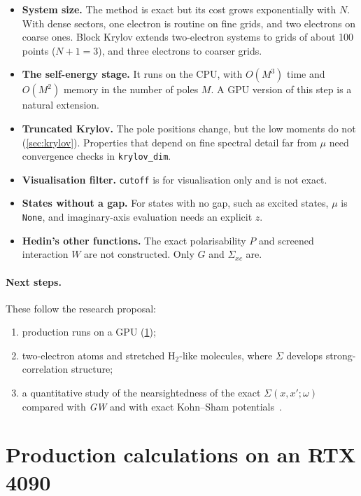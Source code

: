 \documentclass[11pt,a4paper]{article}
\newcommand{\GW}{\textit{GW}}
\newcommand{\code}[1]{\texttt{#1}}
\begin{document}
\begin{itemize}
\item \textbf{System size.} The method is exact but its cost grows exponentially with $N$. With dense sectors, one electron is routine on fine grids, and two electrons on coarse ones. Block Krylov extends two-electron systems to grids of about 100 points ($N+1=3$), and three electrons to coarser grids.
\item \textbf{The self-energy stage.} It runs on the CPU, with $O(M^3)$ time and $O(M^2)$ memory in the number of poles $M$. A GPU version of this step is a natural extension.
\item \textbf{Truncated Krylov.} The pole positions change, but the low moments do not (\cref{sec:krylov}). Properties that depend on fine spectral detail far from $\mu$ need convergence checks in \code{krylov\_dim}.
\item \textbf{Visualisation filter.} \code{cutoff} is for visualisation only and is not exact.
\item \textbf{States without a gap.} For states with no gap, such as excited states, $\mu$ is \code{None}, and imaginary-axis evaluation needs an explicit $z$.
\item \textbf{Hedin's other functions.} The exact polarisability $P$ and screened interaction $W$ are not constructed. Only $G$ and $\Sigma_{xc}$ are.
\end{itemize}

\paragraph{Next steps.} These follow the research proposal:
\begin{enumerate}
\item production runs on a GPU (\cref{app:production});
\item two-electron atoms and stretched H$_2$-like molecules, where $\Sigma$ develops strong-correlation structure;
\item a quantitative study of the nearsightedness of the exact $\Sigma(x,x';\omega)$ compared with \GW{} and with exact Kohn--Sham potentials~\cite{wetherell2019}.
\end{enumerate}

\appendix
\section{Production calculations on an RTX 4090}
\label{app:production}
\end{document}
